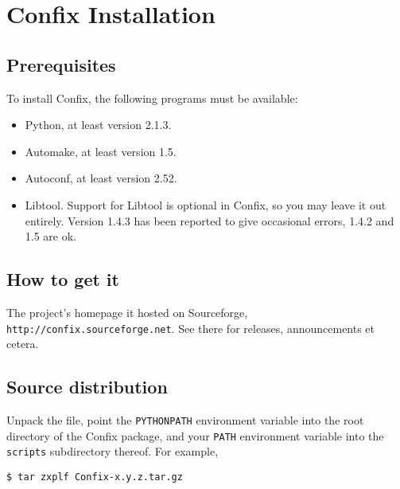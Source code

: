 \chapter{Confix Installation}
\begin{flushright}
{\it }
\end{flushright}

\section{Prerequisites}
To install Confix, the following programs must be available:

\begin{itemize}
\item Python, at least version 2.1.3.
\item Automake, at least version 1.5.
\item Autoconf, at least version 2.52.
\item Libtool. Support for Libtool is optional in Confix, so you may leave
it out entirely. Version 1.4.3 has been reported to give occasional
errors, 1.4.2 and 1.5 are ok.
\end{itemize}


\section{How to get it}

The project's homepage it hosted on Sourceforge,
{\tt http://confix.sourceforge.net}. See there for releases,
announcements et cetera.

\section{Source distribution}
Unpack the file, point the {\tt PYTHONPATH} environment variable into
the root directory of the Confix package, and your {\tt PATH}
environment variable into the {\tt scripts} subdirectory thereof. For
example,
\begin{verbatim}
$ tar zxplf Confix-x.y.z.tar.gz
\end{verbatim}

